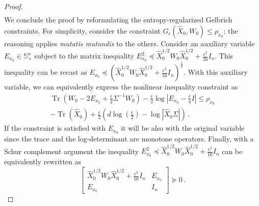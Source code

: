 \documentclass[10pt,a4paper]{amsart}
\newcommand{\Symm}{\mathbb{S}}
\DeclareMathOperator{\Tr}{Tr}
\begin{document}
\begin{proof}
\begin{align*}
\end{align*}
We conclude the proof by reformulating the entropy-regularized Gelbrich constraints. For simplicity, consider the constraint $G_\epsilon(\hat{X}_0, W_0) \leq \rho_{x_0}$; the reasoning applies \textit{mutatis mutandis} to the others. Consider an auxiliary variable $E_{x_0}\in\Symm^n_{+}$ subject to the matrix inequality $E_{x_0}^2 \preceq \hat{X}_0^{1/2} W_0 \hat{X}_0^{1/2} +\frac{\epsilon^2}{16}I_n$. This inequality can be recast as $E_{x_0} \preceq (\hat{X}_0^{1/2} W_0 \hat{X}_0^{1/2} +\frac{\epsilon^2}{16}I_n)^\frac{1}{2}$. With this auxiliary variable, we can equivalently express the nonlinear inequality constraint as
\begin{equation*}
\begin{multlined}
   \Tr\left(W_0 - 2E_{x_0}+\frac{\epsilon}{2}\Sigma^{-1}W_0\right) - \frac{\epsilon}{2}\log\left|E_{x_0} - \frac{\epsilon}{4}I\right| \leq \rho_{x_0}
   \\
   - \Tr(\hat{X}_0) + \frac{\epsilon}{2}\left(d\log\left(\frac{\epsilon}{2}\right)-\log|\hat{X}_0\Sigma|\right)\,.
\end{multlined}
\end{equation*}
If the constraint is satisfied with $E_{x_0}$ it will be also with the original variable since the trace and the log-determinant are monotone operators. Finally, with a Schur complement argument the inequality $E_{x_0}^2 \preceq \hat{X}_0^{1/2} W_0 \hat{X}_0^{1/2} +\frac{\epsilon^2}{16}I_n$ can be equivalently rewritten as
\begin{equation*}
    \begin{bmatrix}
\hat{X}_0^{1/2} W_0 \hat{X}_0^{1/2} +\frac{\epsilon^2}{16}I_n & E_{x_0} \\
E_{x_0} & I_n
\end{bmatrix} \succeq 0\,.
\end{equation*}
\end{proof}
\end{document}
